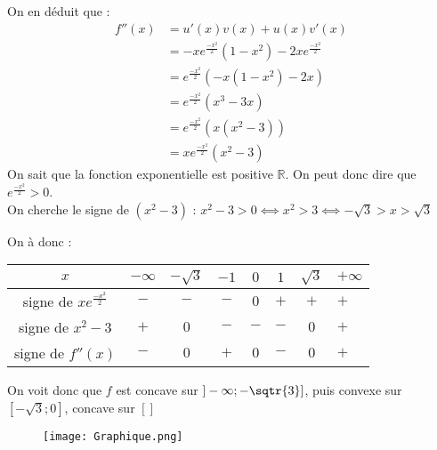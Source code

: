 \documentclass[]{article}
\begin{document}
On en déduit que :
\[
\begin{array}{rll}
        f''(x) &= u'(x)v(x) + u(x)v'(x)\\
               &= -xe^{\frac{-x^2}{2}}\left(1-x^2\right) - 2xe^{\frac{-x^2}{2}}\\
               &= e^{\frac{-x^2}{2}}\left(-x\left(1-x^2\right) - 2x\right)\\
               &= e^{\frac{-x^2}{2}}\left(x^3 - 3x \right)\\
               &= e^{\frac{-x^2}{2}}\left(x\left(x^2 - 3\right)\right)\\
               &= xe^{\frac{-x^2}{2}}\left(x^2 - 3\right)
    \end{array}
\]
On sait que la fonction exponentielle est positive \(\mathbb{R}\). On
peut donc dire que \(e^{\frac{-x^2}{2}} > 0\).\\
On cherche le signe de \((x^2 - 3)\) :
\(x^2 - 3 > 0 ⟺ x^2 > 3 ⟺ -\sqrt{3} > x > \sqrt{3}\)

On à donc :

\begin{longtable}[]{@{}cccccccl@{}}
\toprule
\(x\) & \(-\infty\) & \(-\sqrt{3}\) & \(-1\) & \(0\) & \(1\) &
\(\sqrt{3}\) & \(+\infty\)\tabularnewline
\midrule
\endhead
signe de \(xe^{\frac{-x^2}{2}}\) & \(-\) & \(-\) & \(-\) & \(0\) & \(+\)
& \(+\) & \(+\)\tabularnewline
signe de \(x^2-3\) & \(+\) & \(0\) & \(-\) & \(-\) & \(-\) & \(0\) &
\(+\)\tabularnewline
signe de \(f''(x)\) & \(-\) & \(0\) & \(+\) & \(0\) & \(-\) & \(0\) &
\(+\)\tabularnewline
\bottomrule
\end{longtable}

On voit donc que \(f\) est concave sur \(]-\infty; -\sqtr{3}]\), puis
convexe sur \([-\sqrt{3}; 0]\), concave sur \([]\)

\begin{figure}
  \centering
  \texttt{[image: Graphique.png]}
  \caption{}
\end{figure}
\end{document}
